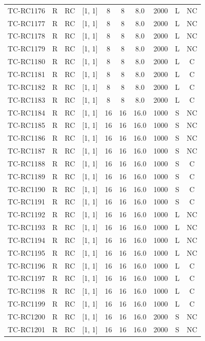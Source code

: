 \begin{longtable}{lccccccccc}
TC-RC1176 & R & RC & [1, 1] & 8 & 8 & 8.0 & 2000 & L & NC \\
TC-RC1177 & R & RC & [1, 1] & 8 & 8 & 8.0 & 2000 & L & NC \\
TC-RC1178 & R & RC & [1, 1] & 8 & 8 & 8.0 & 2000 & L & NC \\
TC-RC1179 & R & RC & [1, 1] & 8 & 8 & 8.0 & 2000 & L & NC \\
TC-RC1180 & R & RC & [1, 1] & 8 & 8 & 8.0 & 2000 & L & C \\
TC-RC1181 & R & RC & [1, 1] & 8 & 8 & 8.0 & 2000 & L & C \\
TC-RC1182 & R & RC & [1, 1] & 8 & 8 & 8.0 & 2000 & L & C \\
TC-RC1183 & R & RC & [1, 1] & 8 & 8 & 8.0 & 2000 & L & C \\
TC-RC1184 & R & RC & [1, 1] & 16 & 16 & 16.0 & 1000 & S & NC \\
TC-RC1185 & R & RC & [1, 1] & 16 & 16 & 16.0 & 1000 & S & NC \\
TC-RC1186 & R & RC & [1, 1] & 16 & 16 & 16.0 & 1000 & S & NC \\
TC-RC1187 & R & RC & [1, 1] & 16 & 16 & 16.0 & 1000 & S & NC \\
TC-RC1188 & R & RC & [1, 1] & 16 & 16 & 16.0 & 1000 & S & C \\
TC-RC1189 & R & RC & [1, 1] & 16 & 16 & 16.0 & 1000 & S & C \\
TC-RC1190 & R & RC & [1, 1] & 16 & 16 & 16.0 & 1000 & S & C \\
TC-RC1191 & R & RC & [1, 1] & 16 & 16 & 16.0 & 1000 & S & C \\
TC-RC1192 & R & RC & [1, 1] & 16 & 16 & 16.0 & 1000 & L & NC \\
TC-RC1193 & R & RC & [1, 1] & 16 & 16 & 16.0 & 1000 & L & NC \\
TC-RC1194 & R & RC & [1, 1] & 16 & 16 & 16.0 & 1000 & L & NC \\
TC-RC1195 & R & RC & [1, 1] & 16 & 16 & 16.0 & 1000 & L & NC \\
TC-RC1196 & R & RC & [1, 1] & 16 & 16 & 16.0 & 1000 & L & C \\
TC-RC1197 & R & RC & [1, 1] & 16 & 16 & 16.0 & 1000 & L & C \\
TC-RC1198 & R & RC & [1, 1] & 16 & 16 & 16.0 & 1000 & L & C \\
TC-RC1199 & R & RC & [1, 1] & 16 & 16 & 16.0 & 1000 & L & C \\
TC-RC1200 & R & RC & [1, 1] & 16 & 16 & 16.0 & 2000 & S & NC \\
TC-RC1201 & R & RC & [1, 1] & 16 & 16 & 16.0 & 2000 & S & NC \\

\end{longtable}
